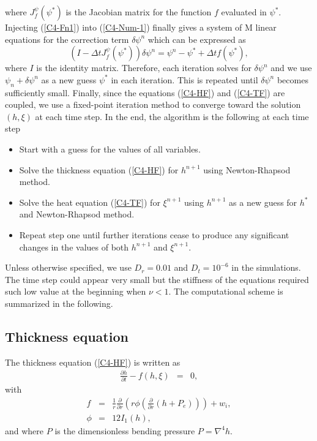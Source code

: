 where  $J^\psi_{f}(\psi^*)$ is  the  Jacobian matrix  for  the function  $f$
evaluated  in $\psi^*$.   Injecting (\ref{C4-Fn1})  into (\ref{C4-Num-1})
finally gives a  system of M linear equations for  the correction term
$\delta \psi^n$ which can be expressed as
\begin{equation}
  (I-\Delta tJ^\psi_{f}(\psi^*))\delta \psi^n=\psi^n-\psi^*+\Delta t f(\psi^*),
\end{equation}
where $I$ is the identity matrix. Therefore, each iteration solves for
$\delta \psi^n$ and we use $\psi_n+\delta \psi^n$  as a new guess $\psi^*$ in each
iteration. This  is repeated  until $\delta \psi^n$  becomes sufficiently
small.  Finally,  since the equations (\ref{C4-HF})  and (\ref{C4-TF})
are coupled, we use a  fixed-point iteration method to converge toward
the solution $(h,\xi)$  at each time step.  In the  end, the algorithm
is the following at each time step
\begin{itemize}
\item Start with a guess for the values of all variables.
\item Solve  the thickness equation (\ref{C4-HF})  for $h^{n+1}$ using
  Newton-Rhapsod method.
\item  Solve the  heat  equation (\ref{C4-TF})  for $\xi^{n+1}$  using
  $h^{n+1}$ as a new guess for $h^*$ and Newton-Rhapsod method.
\item Repeat  step one until  further iterations cease to  produce any
  significant changes in the values of both $h^{n+1}$ and $\xi^{n+1}$.
\end{itemize}
Unless otherwise  specified, we use  $D_r= 0.01$ and  $D_t=10^{-6}$ in
the  simulations.  The  time  step  could appear  very  small but  the
stiffness of  the equations required  such low value at  the beginning
when  $\nu  < 1$.   The  computational  scheme  is summarized  in  the
following.

\subsection{Thickness equation}

The thickness equation (\ref{C4-HF}) is written as
\begin{eqnarray}
  \frac{\partial h}{\partial t}-f(h,\xi)&=&0,
\end{eqnarray}
with
\begin{eqnarray}
  f& =& \frac{1}{r}
        \frac{\partial}{\partial      r}
        \left(      r  \phi\left(     \frac{\partial      }{\partial
        r}\left(h+P_e\right)\right)\right)+w_i,\\
  \phi &=& 12I_1(h),
\end{eqnarray}
and where $P$ is the dimensionless bending pressure $P = \nabla^4h$.

